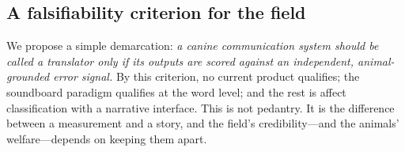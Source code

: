 \subsection{A falsifiability criterion for the field}
We propose a simple demarcation: \emph{a canine communication system should
be called a translator only if its outputs are scored against an
independent, animal-grounded error signal.} By this criterion, no current
product qualifies; the soundboard paradigm qualifies at the word level;
and the rest is affect classification with a narrative interface. This is
not pedantry. It is the difference between a measurement and a story, and
the field's credibility---and the animals' welfare---depends on keeping them
apart.